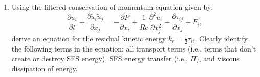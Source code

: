 \documentclass[11pt]{article}
\newcommand\reallywidetilde[1]{\ThisStyle{%
  \setbox0=\hbox{$\SavedStyle#1$}%
  \stackengine{-.1\LMpt}{$\SavedStyle#1$}{%
    \stretchto{\scaleto{\SavedStyle\mkern.2mu\sim}{.5467\wd0}}{.4\ht0}%
  }{O}{c}{F}{T}{S}%
}}
\begin{document}
\begin{enumerate}
\begin{enumerate}
{$$\widetilde{u_i \theta} = \reallywidetilde{(\widetilde{u}_i + u_i^\prime) (\widetilde{\theta} + \theta^\prime)} = \reallywidetilde{\widetilde{u}_i \widetilde{\theta}} + \reallywidetilde{\widetilde{u}_i \theta^\prime} + \reallywidetilde{u_i^\prime \widetilde{\theta}} + \reallywidetilde{u_i^\prime \theta^\prime}$$
Using this decomposition, the SFS scalar flux is given by
$$q_i = L_{ij} + C_{ij} + R_{ij}$$
where
\begin{align*}
L_{ij} & =\reallywidetilde{\widetilde{u}_i \widetilde{\theta}} -  \widetilde{u_i}\widetilde{\theta} &\rightarrow& \text{ interaction among the smallest resolved scales}\\
C_{ij} &= \reallywidetilde{\widetilde{u}_i \theta^\prime} + \reallywidetilde{u_i^\prime \widetilde{\theta}} &\rightarrow& \text{ interaction among resolved and unresolved scales}\\
R_{ij} &= \reallywidetilde{u_i^\prime \theta^\prime} &\rightarrow& \text{ SFS Reynolds flux} 
\end{align*}}
\end{enumerate}
\item Using the filtered conservation of momentum equation given by:
\begin{displaymath}
\frac{\partial \widetilde{u}_i}{\partial t} + \frac{\partial \widetilde{u}_i\widetilde{u}_j}{\partial x_j} = 
-\frac{\partial \widetilde{P}}{\partial x_i} + \frac{1}{Re}\frac{\partial^2 \widetilde{u}_i}{\partial x_j^2}-\frac{\partial \tau_{ij}}{\partial x_j}+F_i,
\end{displaymath}
derive an equation for the residual kinetic energy $k_r=\frac{1}{2}\tau_{ii}$.  Clearly identify the following terms in the equation: all transport terms (i.e., terms that don't create or destroy SFS energy), SFS energy transfer (i.e., $\Pi$), and viscous dissipation of energy.\\


\end{enumerate}
\end{document}
